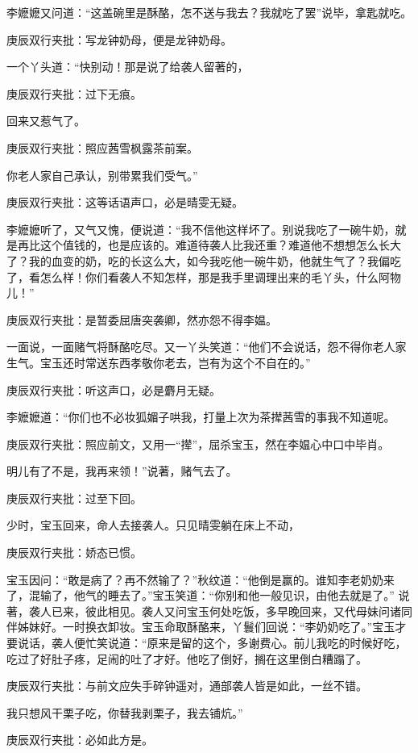 \begin{parag}
    李嬷嬷又问道：“这盖碗里是酥酪，怎不送与我去？我就吃了罢”说毕，拿匙就吃。\begin{note}庚辰双行夹批：写龙钟奶母，便是龙钟奶母。\end{note}一个丫头道：“快别动！那是说了给袭人留著的，\begin{note}庚辰双行夹批：过下无痕。\end{note}回来又惹气了。\begin{note}庚辰双行夹批：照应茜雪枫露茶前案。\end{note}你老人家自己承认，别带累我们受气。”\begin{note}庚辰双行夹批：这等话语声口，必是晴雯无疑。\end{note}李嬷嬷听了，又气又愧，便说道：“我不信他这样坏了。别说我吃了一碗牛奶，就是再比这个值钱的，也是应该的。难道待袭人比我还重？难道他不想想怎么长大了？我的血变的奶，吃的长这么大，如今我吃他一碗牛奶，他就生气了？我偏吃了，看怎么样！你们看袭人不知怎样，那是我手里调理出来的毛丫头，什么阿物儿！”\begin{note}庚辰双行夹批：是暂委屈唐突袭卿，然亦怨不得李媪。\end{note}一面说，一面赌气将酥酪吃尽。又一丫头笑道：“他们不会说话，怨不得你老人家生气。宝玉还时常送东西孝敬你老去，岂有为这个不自在的。”\begin{note}庚辰双行夹批：听这声口，必是麝月无疑。\end{note}李嬷嬷道：“你们也不必妆狐媚子哄我，打量上次为茶撵茜雪的事我不知道呢。\begin{note}庚辰双行夹批：照应前文，又用一“撵”，屈杀宝玉，然在李媪心中口中毕肖。\end{note}明儿有了不是，我再来领！”说著，赌气去了。\begin{note}庚辰双行夹批：过至下回。\end{note}
\end{parag}


\begin{parag}
    少时，宝玉回来，命人去接袭人。只见晴雯躺在床上不动，\begin{note}庚辰双行夹批：娇态已惯。\end{note}宝玉因问：“敢是病了？再不然输了？”秋纹道：“他倒是赢的。谁知李老奶奶来了，混输了，他气的睡去了。”宝玉笑道：“你别和他一般见识，由他去就是了。” 说著，袭人已来，彼此相见。袭人又问宝玉何处吃饭，多早晚回来，又代母妹问诸同伴姊妹好。一时换衣卸妆。宝玉命取酥酪来，丫鬟们回说：“李奶奶吃了。”宝玉才要说话，袭人便忙笑说道：“原来是留的这个，多谢费心。前儿我吃的时候好吃，吃过了好肚子疼，足闹的吐了才好。他吃了倒好，搁在这里倒白糟蹋了。\begin{note}庚辰双行夹批：与前文应失手碎钟遥对，通部袭人皆是如此，一丝不错。\end{note}我只想风干栗子吃，你替我剥栗子，我去铺炕。”\begin{note}庚辰双行夹批：必如此方是。\end{note}
\end{parag}


